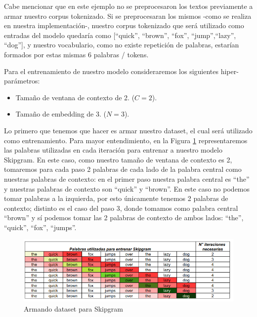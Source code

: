 \documentclass[12pt,a4paper]{article}
\begin{document}
\begin{sloppypar}
Cabe mencionar que en este ejemplo no se preprocesaron los textos previamente a armar nuestro corpus tokenizado. Si se preprocesaran los mismos -como se realiza en nuestra implementación-, nuestro corpus tokenizado que será utilizado como entradas del modelo quedaría como [“quick”, “brown”, “fox”, “jump”,“lazy”, “dog”], y nuestro vocabulario, como no existe repetición de palabras, estarían formados por estas mismas 6 palabras / tokens.

Para el entrenamiento de nuestro modelo consideraremos los siguientes hiper-parámetros:
\begin{itemize}
\item Tamaño de ventana de contexto de 2. ($C=2$).
\item Tamaño de embedding de 3. ($N=3$).
\end{itemize}

Lo primero que tenemos que hacer es armar nuestro dataset, el cual será utilizado como entrenamiento. Para mayor entendimiento, en la Figura \ref{fig:1_EjSkip} representaremos las palabras utilizadas en cada iteración para entrenar a nuestro modelo Skipgram. En este caso, como nuestro tamaño de ventana de contexto es 2, tomaremos para cada paso 2 palabras de cada lado de la palabra central como nuestras palabras de contexto: en el primer paso nuestra palabra central es “the” y nuestras palabras de contexto son “quick” y “brown”. En este caso no podemos tomar palabras a la izquierda, por esto únicamente tenemos 2 palabras de contexto; distinto es el caso del paso 3, donde tomamos como palabra central “brown” y sí podemos tomar las 2 palabras de contexto de ambos lados: “the”, “quick”, “fox”, “jumps”. 

\begin{figure}[H]    %
\centering
\includegraphics[width=1\textwidth]{images/Ejemplo_Skipgram/1_EjSkip.png}
\caption{Armando dataset para Skipgram} 
\label{fig:1_EjSkip}
\end{figure}


\end{sloppypar}
\end{document}

